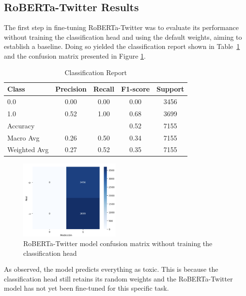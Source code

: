 \subsection{RoBERTa-Twitter Results}

The first step in fine-tuning RoBERTa-Twitter was to evaluate its performance without training the classification head and using the default weights, aiming to establish a baseline. Doing so yielded the classification report shown in Table~\ref{tab:classification_report_1} and the confusion matrix presented in Figure \ref{fig:confusion_matrix_roberta_shapeY_no_head}.

\begin{table}[H]
\centering
\caption{Classification Report}
\label{tab:classification_report_1}
\begin{tabular}{lcccc}
\toprule
Class        & Precision & Recall & F1-score & Support \\
\midrule
0.0          & 0.00      & 0.00   & 0.00     & 3456    \\
1.0          & 0.52      & 1.00   & 0.68     & 3699    \\
\midrule
Accuracy     &           &        & 0.52     & 7155    \\
Macro Avg    & 0.26      & 0.50   & 0.34     & 7155    \\
Weighted Avg & 0.27      & 0.52   & 0.35     & 7155    \\
\bottomrule
\end{tabular}
\end{table}

\begin{figure}[H]
    \centering
    \includegraphics[width=0.45\textwidth]{images/confusion_matrix_bilstm_shapeY.png}
    \caption{RoBERTa-Twitter model confusion matrix without training the classification head}
    \label{fig:confusion_matrix_roberta_shapeY_no_head}
\end{figure}


As observed, the model predicts everything as toxic. This is because the classification head still retains its random weights and the RoBERTa-Twitter model has not yet been fine-tuned for this specific task.

